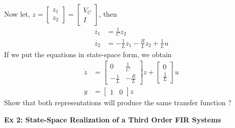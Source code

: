 \documentclass[twoside]{article}
\begin{document}
Now let, $z = \left[ \begin{array}{c} z_1 \\ z_2 \end{array} \right] =
\left[ \begin{array}{c} V_C \\ I \end{array} \right]$, then 
%
\begin{align*}
	\dot{z_1} &= \frac{1}{C} z_2 \\
	\dot{z_2} &= -\frac{1}{L} z_1 - \frac{R}{L} z_2 + \frac{1}{L} u
\end{align*}
%
If we put the equations in state-space form, we obtain
%
\begin{align*}
 \dot{z} &= \left[  \begin{array}{cc} 0 & \frac{1}{C} \\ -\frac{1}{L} &  -\frac{R}{L}  \end{array} \right] z 
 +  \left[  \begin{array}{c} 0 \\ \frac{1}{L} \end{array} \right] u
 \\
 y &= \left[  \begin{array}{cc} 1 & 0 \end{array} \right] z
\end{align*}
%
Show that both representations will produce the same transfer function ?

\vspace{6pt}

\textbf{Ex 2: State-Space Realization of a Third Order FIR Systems}
\end{document}
